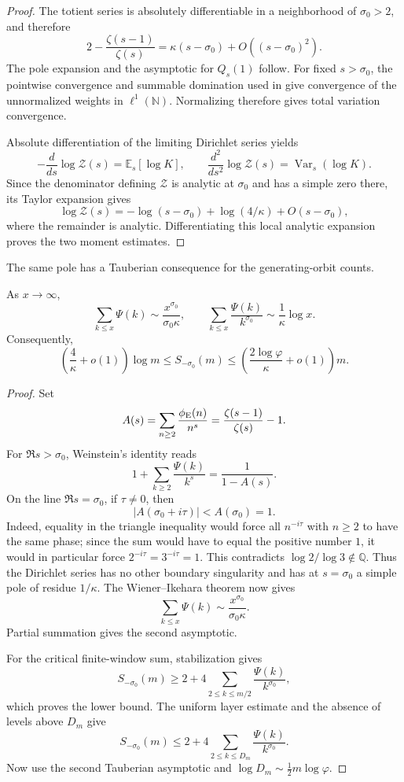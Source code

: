 \begin{proof}
The totient series is absolutely differentiable in a neighborhood of
\(\sigma_0>2\), and therefore
\[
 2-\frac{\zeta(s-1)}{\zeta(s)}
 =\kappa(s-\sigma_0)+O((s-\sigma_0)^2).
\]
The pole expansion and the asymptotic for \(Q_s(1)\) follow.  For fixed
\(s>\sigma_0\), the pointwise convergence and summable domination used in
 give convergence of the unnormalized
weights in \(\ell^1(\mathbb N)\).  Normalizing therefore gives total
variation convergence.

Absolute differentiation of the limiting Dirichlet series yields
\[
 -\frac{d}{ds}\log\mathcal Z(s)=\mathbb E_s[\log K],
 \qquad
 \frac{d^2}{ds^2}\log\mathcal Z(s)
 =\operatorname{Var}_s(\log K).
\]
Since the denominator defining \(\mathcal Z\) is analytic at \(\sigma_0\)
and has a simple zero there, its Taylor expansion gives
\[
 \log\mathcal Z(s)
 =-\log(s-\sigma_0)+\log(4/\kappa)+O(s-\sigma_0),
\]
where the remainder is analytic.  Differentiating this local analytic
expansion proves the two moment estimates.
\end{proof}

The same pole has a Tauberian consequence for the generating-orbit counts.

\begin{theorem}
\label{thm:psi-tauberian}
As \(x\to\infty\),
\[
 \sum_{k\le x}\Psi(k)
 \sim\frac{x^{\sigma_0}}{\sigma_0\kappa},
 \qquad
 \sum_{k\le x}\frac{\Psi(k)}{k^{\sigma_0}}
 \sim\frac1\kappa\log x.
\]
Consequently,
\[
 \left(\frac4\kappa+o(1)\right)\log m
 \le S_{-\sigma_0}(m)
 \le\left(\frac{2\log\varphi}{\kappa}+o(1)\right)m.
\]
\end{theorem}

\begin{proof}
Set
\[
 A(s)=\sum_{n\ge2}\frac{\phi_{\rm E}(n)}{n^s}
 =\frac{\zeta(s-1)}{\zeta(s)}-1.
\]
For \(\Re s>\sigma_0\), Weinstein's identity reads
\[
 1+\sum_{k\ge2}\frac{\Psi(k)}{k^s}=\frac1{1-A(s)}.
\]
On the line \(\Re s=\sigma_0\), if \(\tau\ne0\), then
\[
 |A(\sigma_0+i\tau)|<A(\sigma_0)=1.
\]
Indeed, equality in the triangle inequality would force all
\(n^{-i\tau}\) with \(n\ge2\) to have the same phase; since the sum would
have to equal the positive number \(1\), it would in particular force
\(2^{-i\tau}=3^{-i\tau}=1\).  This contradicts
\(\log2/\log3\notin\mathbb Q\).  Thus the Dirichlet series has no other
boundary singularity and has at \(s=\sigma_0\) a simple pole of residue
\(1/\kappa\).  The Wiener--Ikehara theorem
\cite{Korevaar2004} now gives
\[
 \sum_{k\le x}\Psi(k)
 \sim\frac{x^{\sigma_0}}{\sigma_0\kappa}.
\]
Partial summation gives the second asymptotic.

For the critical finite-window sum, stabilization gives
\[
 S_{-\sigma_0}(m)
 \ge2+4\sum_{2\le k\le m/2}\frac{\Psi(k)}{k^{\sigma_0}},
\]
which proves the lower bound.  The uniform layer estimate and the absence of
levels above \(D_m\) give
\[
 S_{-\sigma_0}(m)
 \le2+4\sum_{2\le k\le D_m}\frac{\Psi(k)}{k^{\sigma_0}}.
\]
Now use the second Tauberian asymptotic and
\(\log D_m\sim\tfrac12m\log\varphi\).
\end{proof}

